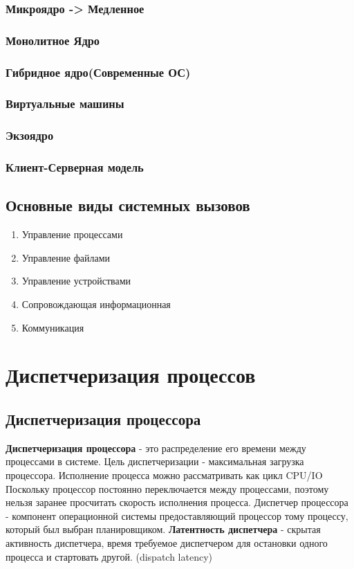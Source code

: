 \documentclass[a4paper]{article}
\begin{document}
\subsubsection{Микроядро -> Медленное}
\subsubsection{Монолитное Ядро}
\subsubsection{Гибридное ядро(Современные ОС)}
\subsubsection{Виртуальные машины}
\subsubsection{Экзоядро}
\subsubsection{Клиент-Серверная модель}

\subsection{Основные виды системных вызовов}
\begin{enumerate}
    \item Управление процессами
    \item Управление файлами
    \item Управление устройствами
    \item Сопровождающая информационная
    \item Коммуникация
\end{enumerate}


\section{Диспетчеризация процессов}
\subsection{Диспетчеризация процессора}
\textbf{Диспетчеризация процессора} - это распределение его времени между процессами в системе.
Цель диспетчеризации - максимальная загрузка процессора. 
Исполнение процесса можно рассматривать как цикл CPU/IO
Поскольку процессор постоянно переключается между процессами, поэтому нельзя заранее просчитать скорость исполнения процесса.
Диспетчер процессора - компонент операционной системы предоставляющий процессор тому процессу, который был выбран планировщиком.
\textbf{Латентность диспетчера} - скрытая активность диспетчера, время требуемое диспетчером для остановки одного процесса и стартовать другой. (dispatch latency)
\end{document}
